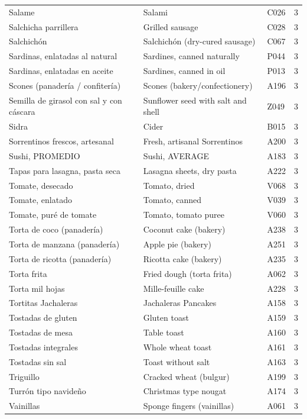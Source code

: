 {\begin{longtable}{p{4.3cm}p{5.5cm}p{1.5cm}p{0.7cm}}
Salame & Salami & C026 & 3\\
Salchicha parrillera & Grilled sausage & C028 & 3\\
Salchichón & Salchichón (dry-cured sausage) & C067 & 3\\
Sardinas, enlatadas al natural & Sardines, canned naturally & P044 & 3\\
Sardinas, enlatadas en aceite & Sardines, canned in oil & P013 & 3\\
Scones (panadería / confitería) & Scones (bakery/confectionery) & A196 & 3\\
Semilla de girasol con sal y con cáscara & Sunflower seed with salt and shell & Z049 & 3\\
Sidra & Cider & B015 & 3\\
Sorrentinos frescos, artesanal & Fresh, artisanal Sorrentinos & A200 & 3\\
Sushi, PROMEDIO & Sushi, AVERAGE & A183 & 3\\
Tapas para lasagna, pasta seca & Lasagna sheets, dry pasta & A222 & 3\\
Tomate, desecado & Tomato, dried & V068 & 3\\
Tomate, enlatado & Tomato, canned & V039 & 3\\
Tomate, puré de tomate & Tomato, tomato puree & V060 & 3\\
Torta de coco (panadería) & Coconut cake (bakery) & A238 & 3\\
Torta de manzana (panadería) & Apple pie (bakery) & A251 & 3\\
Torta de ricotta (panadería) & Ricotta cake (bakery) & A235 & 3\\
Torta frita & Fried dough (torta frita) & A062 & 3\\
Torta mil hojas & Mille-feuille cake & A228 & 3\\
Tortitas Jachaleras & Jachaleras Pancakes & A158 & 3\\
Tostadas de gluten & Gluten toast & A159 & 3\\
Tostadas de mesa & Table toast & A160 & 3\\
Tostadas integrales & Whole wheat toast & A161 & 3\\
Tostadas sin sal & Toast without salt & A163 & 3\\
Triguillo & Cracked wheat (bulgur) & A199 & 3\\
Turrón tipo navideño & Christmas type nougat & A174 & 3\\
Vainillas & Sponge fingers (vainillas) & A061 & 3\\

\end{longtable}}
